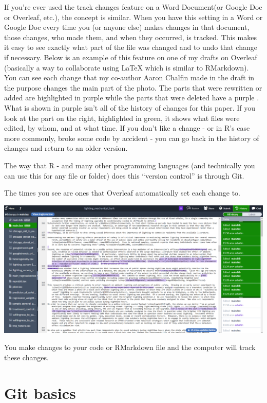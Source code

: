 \documentclass[
  12pt,
]{book}
\begin{document}
If you're ever used the track changes feature on a Word Document(or Google Doc or Overleaf, etc.), the concept is similar. When you have this setting in a Word or Google Doc every time you (or anyone else) makes changes in that document, those changes, who made them, and when they occurred, is tracked. This makes it easy to see exactly what part of the file was changed and to undo that change if necessary. Below is an example of this feature on one of my drafts on Overleaf (basically a way to collaborate using LaTeX which is similar to RMarkdown). You can see each change that my co-author Aaron Chalfin made in the draft in the purpose changes the main part of the photo. The parts that were rewritten or added are highlighted in purple while the parts that were deleted have a purple . What is shown in purple isn't all of the history of changes for this paper. If you look at the part on the right, highlighted in green, it shows what files were edited, by whom, and at what time. If you don't like a change - or in R's case more commonly, broke some code by accident - you can go back in the history of changes and return to an older version.

The way that R - and many other programming languages (and technically you can use this for any file or folder) does this ``version control'' is through Git.

The times you see are ones that Overleaf automatically set each change to.

\includegraphics{images/overleaf.png}

You make changes to your code or RMarkdown file and the computer will track these changes.

\hypertarget{git-basics}{%
\section{Git basics}\label{git-basics}}
\end{document}
